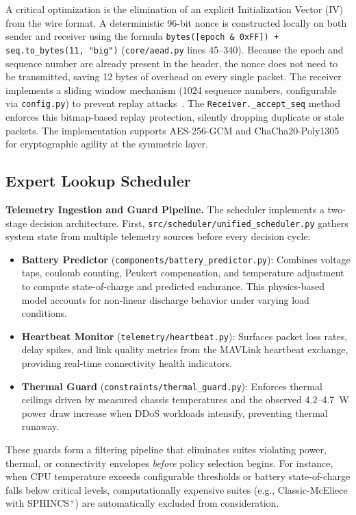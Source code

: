 \documentclass[sigconf,natbib=false]{acmart}
\begin{document}
A critical optimization is the elimination of an explicit Initialization Vector (IV) from the wire format. A deterministic 96-bit nonce is constructed locally on both sender and receiver using the formula \texttt{bytes([epoch \& 0xFF]) + seq.to\_bytes(11, "big")} (\texttt{core/aead.py} lines 45--340). Because the epoch and sequence number are already present in the header, the nonce does not need to be transmitted, saving 12 bytes of overhead on every single packet. The receiver implements a sliding window mechanism (1024 sequence numbers, configurable via \texttt{config.py}) to prevent replay attacks~\cite{nist_sp800_232_2025}. The \texttt{Receiver.\_accept\_seq} method enforces this bitmap-based replay protection, silently dropping duplicate or stale packets. The implementation supports AES-256-GCM and ChaCha20-Poly1305 for cryptographic agility at the symmetric layer.

\subsection{Expert Lookup Scheduler}

\textbf{Telemetry Ingestion and Guard Pipeline.}
The scheduler implements a two-stage decision architecture. First, \texttt{src/scheduler/unified\_scheduler.py} gathers system state from multiple telemetry sources before every decision cycle:

\begin{itemize}
    \item \textbf{Battery Predictor} (\texttt{components/battery\_predictor.py}): Combines voltage taps, coulomb counting, Peukert compensation, and temperature adjustment to compute state-of-charge and predicted endurance. This physics-based model accounts for non-linear discharge behavior under varying load conditions.
    \item \textbf{Heartbeat Monitor} (\texttt{telemetry/heartbeat.py}): Surfaces packet loss rates, delay spikes, and link quality metrics from the MAVLink heartbeat exchange, providing real-time connectivity health indicators.
    \item \textbf{Thermal Guard} (\texttt{constraints/thermal\_guard.py}): Enforces thermal ceilings driven by measured chassis temperatures and the observed 4.2--4.7~W power draw increase when DDoS workloads intensify, preventing thermal runaway.
\end{itemize}

These guards form a filtering pipeline that eliminates suites violating power, thermal, or connectivity envelopes \textit{before} policy selection begins. For instance, when CPU temperature exceeds configurable thresholds or battery state-of-charge falls below critical levels, computationally expensive suites (e.g., Classic-McEliece with SPHINCS$^+$) are automatically excluded from consideration.
\end{document}
